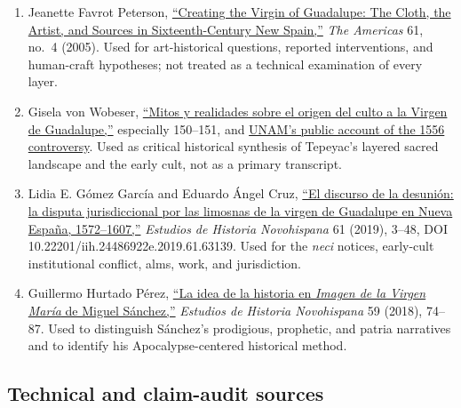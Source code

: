 \begin{enumerate}
  \item Jeanette Favrot Peterson, \href{https://www.cambridge.org/core/journals/americas/article/abs/creating-the-virgin-of-guadalupe-the-cloth-the-artist-and-sources-in-sixteenthcentury-new-spain/71AAA4630ADE9C2A43888FB46982FF31}{“Creating the Virgin of Guadalupe: The Cloth, the Artist, and Sources in Sixteenth-Century New Spain,”} \emph{The Americas} 61, no.~4 (2005). Used for art-historical questions, reported interventions, and human-craft hypotheses; not treated as a technical examination of every layer.

  \item Gisela von Wobeser, \href{https://ru.historicas.unam.mx/handle/20.500.12525/434?show=full}{“Mitos y realidades sobre el origen del culto a la Virgen de Guadalupe,”} especially 150--151, and \href{https://unamglobal.unam.mx/2020/12/11/}{UNAM's public account of the 1556 controversy}. Used as critical historical synthesis of Tepeyac's layered sacred landscape and the early cult, not as a primary transcript.

  \item Lidia E. Gómez García and Eduardo Ángel Cruz, \href{https://www.scielo.org.mx/pdf/ehn/n61/0185-2523-ehn-61-3.pdf}{“El discurso de la desunión: la disputa jurisdiccional por las limosnas de la virgen de Guadalupe en Nueva España, 1572--1607,”} \emph{Estudios de Historia Novohispana} 61 (2019), 3--48, DOI 10.22201/iih.24486922e.2019.61.63139. Used for the \emph{neci} notices, early-cult institutional conflict, alms, work, and jurisdiction.

  \item Guillermo Hurtado Pérez, \href{https://novohispana.historicas.unam.mx/index.php/ehn/article/view/63244}{“La idea de la historia en \emph{Imagen de la Virgen María} de Miguel Sánchez,”} \emph{Estudios de Historia Novohispana} 59 (2018), 74--87. Used to distinguish Sánchez's prodigious, prophetic, and patria narratives and to identify his Apocalypse-centered historical method.
\end{enumerate}

\subsection{Technical and claim-audit sources}

